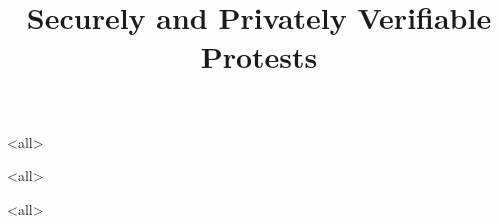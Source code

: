 \title{%
  Securely and Privately Verifiable Protests
}

\maketitle

\mode*

\begin{abstract}
  
\end{abstract}

\clearpage
\tableofcontents
\clearpage

\mode<all>


\mode<all>



\mode<all>




\begin{frame}[allowframebreaks]
  \printbibliography{}
\end{frame}
